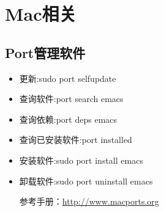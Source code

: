 


\section{Mac相关}
\label{sec:mac}

\subsection{Port管理软件}
\label{sec:port}

\begin{itemize}
\item 更新:sudo port selfupdate
\item 查询软件:port search emacs
\item 查询依赖:port deps emacs
\item 查询已安装软件:port installed
\item 安装软件:sudo port install emacs
\item 卸载软件:sudo port uninstall emacs

参考手册：\url{http://www.macports.org}
\end{itemize}